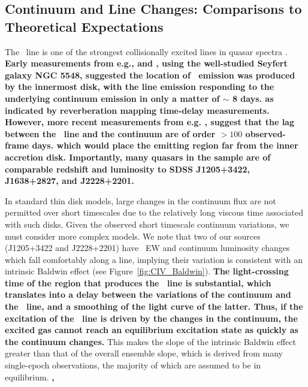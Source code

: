 \documentclass[fleqn,usenatbib]{mnras}
\begin{document}
\subsection{Continuum and Line Changes: Comparisons to Theoretical Expectations}\label{sec:theory}
The \civ\ line is one of the strongest collisionally excited lines in
quasar spectra \citep[e.g.,][]{HamannFerland1999}.
{\bf Early measurements from e.g., 
  \citet{PoggePeterson1992} and \citet{Peterson1997book}, 
  using the well-studied Seyfert galaxy NGC 5548,
  suggested the location of \civ\ emission was 
  produced by the innermost disk, with the line emission
  responding to the underlying continuum emission in only
  a matter of $\sim$ 8 days. 
as indicated by reverberation mapping time-delay measurements.
However, more recent measurements from e.g. \citet[][and references therein]{Grier2019},
suggest that the lag between the \civ\ line and the continuum are of order $>100$ observed-frame days. 
which would place the \civ emitting region far from the inner accretion disk.
Importantly, many quasars in the \citet{Grier2019} sample are of
comparable redshift and luminosity to SDSS J1205+3422, J1638+2827, and J2228+2201.}


In standard \citet{SS73} thin disk models, large changes in the
continuum flux are not permitted over short timescales due to the
relatively long viscous time associated with such disks. Given the
observed short timescale continuum variations, we must consider more
complex models. We note that two of our sources (J1205+3422 and
J2228+2201) have \civ\ EW and continuum luminosity changes which fall
comfortably along a line, implying their variation is consistent with
an intrinsic Baldwin effect (see Figure~\ref{fig:CIV_Baldwin}).
{\bf The light-crossing time of the region that produces the \civ\ line is substantial,
which translates into a delay between the variations of the continuum and
the \civ\ line, and a smoothing of the light curve of the latter.
Thus, if the excitation of the \civ\ line is driven by the changes in the
continuum, the excited gas cannot reach an equilibrium
excitation state as quickly as the continuum changes.}
This makes the slope of the intrinsic Baldwin effect greater than that
of the overall ensemble slope, which is derived from many single-epoch
observations, the majority of which are assumed to be in equilibrium.
{\bf \citet{Grier2019}, }
\end{document}
